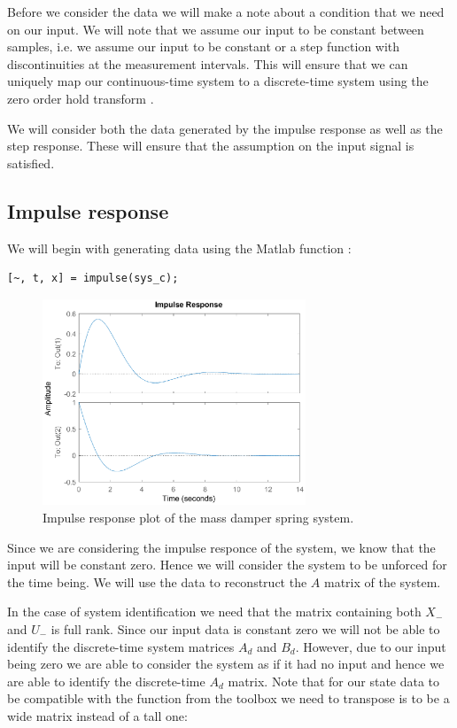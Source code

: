 Before we consider the data we will make a note about a condition that we need on our input. We will note that we assume our input to be constant between samples, i.e. we assume our input to be constant or a step function with discontinuities at the measurement intervals. This will ensure that we can uniquely map our continuous-time system to a discrete-time system using the zero order hold transform \cite{kollar1996equivalence}. 

We will consider both the data generated by the impulse response as well as the step response. These will ensure that the assumption on the input signal is satisfied.

\subsection{Impulse response}
We will begin with generating data using the Matlab function :

\begin{lstlisting}
[~, t, x] = impulse(sys_c);
\end{lstlisting}

\begin{figure}[H]
	\centering
	\includegraphics[width=0.7\textwidth]{impulse_response_msd.eps}
	\caption{Impulse response plot of the mass damper spring system.}
\end{figure}

Since we are considering the impulse responce of the system, we know that the input will be constant zero. Hence we will consider the system to be unforced for the time being. We will use the data to reconstruct the $A$ matrix of the system.

In the case of system identification we need that the matrix containing both $X_-$ and $U_-$ is full rank. Since our input data is constant zero we will not be able to identify the discrete-time system matrices $A_d$ and $B_d$. However, due to our input being zero we are able to consider the system as if it had no input and hence we are able to identify the discrete-time $A_d$ matrix. Note that for our state data to be compatible with the function from the toolbox we need to transpose is to be a wide matrix instead of a tall one:

